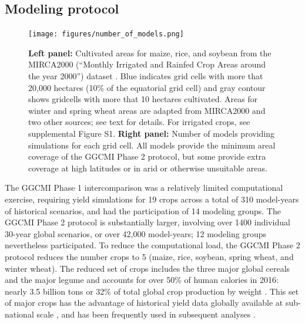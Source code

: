 \documentclass[gmd, manuscript]{copernicus} %
\begin{document}
\subsection{Modeling protocol}
\begin{figure}[ht]
  \centering
  \texttt{[image: figures/number\_of\_models.png]}
  \caption{
  \textbf{Left panel:} Cultivated areas for maize, rice, and soybean from the MIRCA2000 (``Monthly Irrigated and Rainfed Crop Areas around the year 2000'') dataset \citep{Portmann2010}. Blue indicates grid cells with more that 20,000 hectares (10\% of the equatorial grid cell) and gray contour shows gridcells with more that 10 hectares cultivated. 
  Areas for winter and spring wheat areas are adapted from MIRCA2000 and two other sources; see text for details.  For irrigated crops, see supplemental Figure S1.
  \textbf{Right panel:} Number of models providing simulations for each grid cell.  
  All models provide the minimum areal coverage of the GGCMI Phase 2 protocol, but some provide extra coverage at high latitudes or in arid or otherwise unsuitable areas.}
  \label{fig:crop_area}
\end{figure}

The GGCMI Phase 1 intercomparison was a relatively limited computational exercise, requiring yield simulations for 19 crops across a total of 310 model-years of historical scenarios, and had the participation of 14 modeling groups.
The GGCMI Phase 2 protocol is substantially larger, involving over 1400 individual 30-year global scenarios, or over 42,000 model-years; 12 modeling groups nevertheless participated. To reduce the computational load, the GGCMI Phase 2 protocol reduces the number crops to 5 (maize, rice, soybean, spring wheat, and winter wheat). 
The reduced set of crops includes the three major global cereals and the major legume and accounts for over 50\% of human calories in 2016: nearly 3.5 billion tons or 32\% of total global crop production by weight \citep{FAOSTAT}. 
This set of major crops has the advantage of historical yield data globally available at sub-national scale \citep{Ray2012,iizumi_historical_2014}, and has been frequently used in subsequent analyses \citep[e.g.][]{muller_global_2017,porwollik_spatial_2016}.
\end{document}
